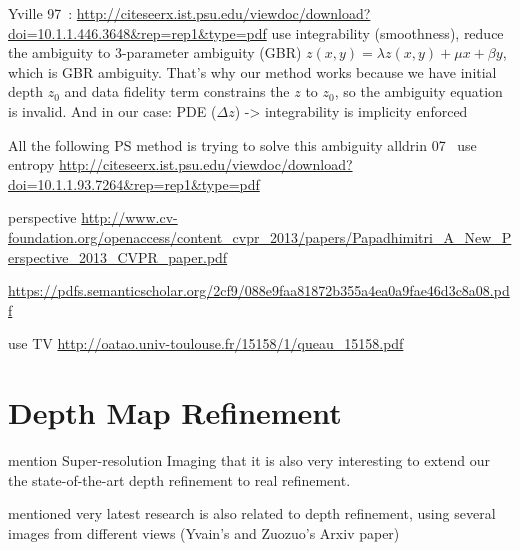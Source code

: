 Yville 97~\cite{yuille1997shape}: \url{http://citeseerx.ist.psu.edu/viewdoc/download?doi=10.1.1.446.3648&rep=rep1&type=pdf}
use integrability (smoothness), reduce the ambiguity to 3-parameter ambiguity (GBR)
$z(x,y) = \lambda z(x,y) + \mu x + \beta y$, which is GBR ambiguity. That's why our method works because we have initial depth $z_0$ and data fidelity term constrains the $z$ to $z_0$, so the ambiguity equation is invalid. 
And in our case: PDE ($\Delta z$) -> integrability is implicity enforced

All the following PS method is trying to solve this ambiguity
alldrin 07~\cite{alldrin2007resolving} use entropy \url{http://citeseerx.ist.psu.edu/viewdoc/download?doi=10.1.1.93.7264&rep=rep1&type=pdf}

\cite{papadhimitri2013new} perspective \url{http://www.cv-foundation.org/openaccess/content_cvpr_2013/papers/Papadhimitri_A_New_Perspective_2013_CVPR_paper.pdf}

\cite{papadhimitri2014closed}\url{https://pdfs.semanticscholar.org/2cf9/088e9faa81872b355a4ea0a9fae46d3c8a08.pdf}

\cite{queau2015solving} use TV \url{http://oatao.univ-toulouse.fr/15158/1/queau_15158.pdf}



\section{Depth Map Refinement}
mention Super-resolution Imaging that it is also very interesting to extend our the state-of-the-art depth refinement to real refinement.

mentioned very latest research is also related to depth refinement, using several images from different views (Yvain's and Zuozuo's Arxiv paper) 

%
%
